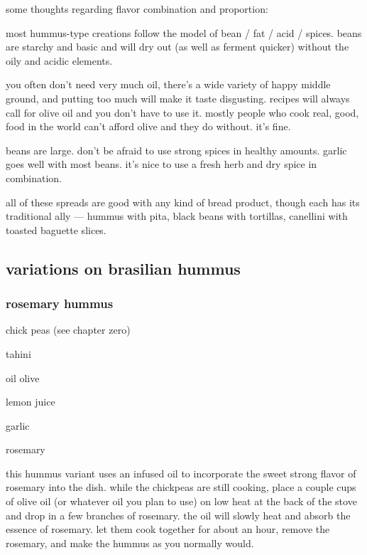 some thoughts regarding flavor combination and proportion:

\begin{algorithm}
  \item most \gls{hummus}-type creations follow the model of bean / fat /
  acid / spices. beans are starchy and basic and will dry out (as well
  as ferment quicker) without the oily and acidic elements.

  \item you often don't need very much oil, there's a wide
  variety of happy middle ground, and putting too much will make it
  taste disgusting. recipes will always call for olive oil and you
  don't have to use it. mostly people who cook real, good, food in
  the world can't afford olive and they do without. it's fine.

  \item beans are large. don't be afraid to use strong spices in
  healthy amounts. garlic goes well with most beans. it's nice to
  use a fresh herb and dry spice in combination.
\end{algorithm}

all of these spreads are good with any kind of bread product, though
each has its traditional ally --- \gls{hummus} with pita, black beans with
tortillas, canellini with toasted baguette slices.

\subsection{variations on brasilian hummus}

\subsubsection{rosemary hummus}

\begin{ingredients}
  \item chick peas (see chapter zero)
  \item tahini
  \item oil olive
  \item lemon juice
  \item garlic
  \item rosemary
\end{ingredients}

this \gls{hummus} variant uses an infused oil to incorporate the sweet
strong flavor of rosemary into the dish. while the chickpeas are still
cooking, place a couple cups of olive oil (or whatever oil you plan to
use) on low heat at the back of the stove and drop in a few branches
of rosemary. the oil will slowly heat and absorb the essence of
rosemary. let them cook together for about an hour, remove the
rosemary, and make the \gls{hummus} as you normally would.

